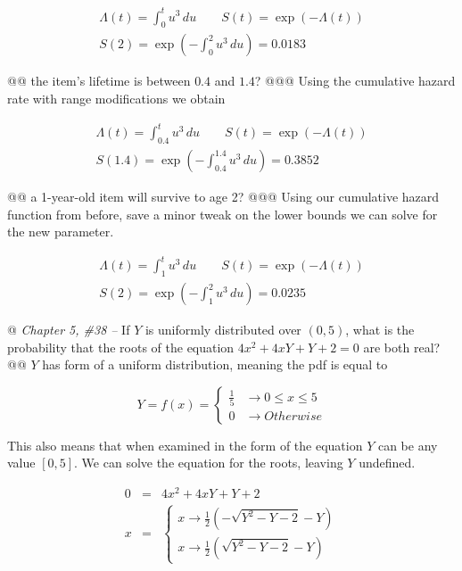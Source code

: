 \documentclass[10pt]{article}\usepackage[]{graphicx}\usepackage[]{xcolor}
\begin{document}
\begin{easylist}[enumerate]
    \[
        \begin{aligned}
            \Lambda(t) = \int_0^t u^3 \, du \qquad S(t) = \exp(-\Lambda(t))\\
            S(2) = \exp \left( - \int_0^2 u^3 \, du \right) =
                \boxed{0.0183}
        \end{aligned}
    \]

    @@ the item's lifetime is between $0.4$ and $1.4$?
    @@@ Using the cumulative hazard rate with range modifications we obtain

    \[
        \begin{aligned}
            \Lambda(t) = \int_{0.4}^t u^3 \, du \qquad S(t) = \exp(-\Lambda(t))\\
            S(1.4) = \exp \left( - \int_{0.4}^{1.4} u^3 \, du \right) =
                \boxed{0.3852}
        \end{aligned}
    \]

    @@ a 1-year-old item will survive to age 2?
    @@@ Using our cumulative hazard function from before, save a minor tweak on the lower bounds we can solve for the
    new parameter.

    \[
        \begin{aligned}
            \Lambda(t) = \int_1^t u^3 \, du \qquad S(t) = \exp(-\Lambda(t))\\
            S(2) = \exp \left( - \int_1^2 u^3 \, du \right) =
                \boxed{0.0235}
        \end{aligned}
    \]

    @ \textit{Chapter 5, \#38 --} If $Y$ is uniformly distributed over $(0, 5)$, what is the probability that the roots
    of the equation $4x^2 + 4xY + Y + 2 = 0$ are both real?
    @@ $Y$ has form of a uniform distribution, meaning the pdf is equal to

    \[
        Y = f(x) =
        \begin{cases}
            \frac{1}{5} &\to 0 \le x \le 5\\
            0 &\to Otherwise
        \end{cases}
    \]

    This also means that when examined in the form of the equation $Y$ can be any value $[0,5]$. We can solve the
    equation for the roots, leaving $Y$ undefined.

    \[
        \begin{aligned}
            0 &=& 4x^2 + 4xY + Y + 2\\
            x &=& \begin{cases}
                        x \to \frac{1}{2} \left(-\sqrt{Y^2-Y-2}-Y\right)\\
                        x \to \frac{1}{2} \left(\sqrt{Y^2-Y-2}-Y\right)
                  \end{cases}\\
        \end{aligned}
    \]


\end{easylist}
\end{document}
